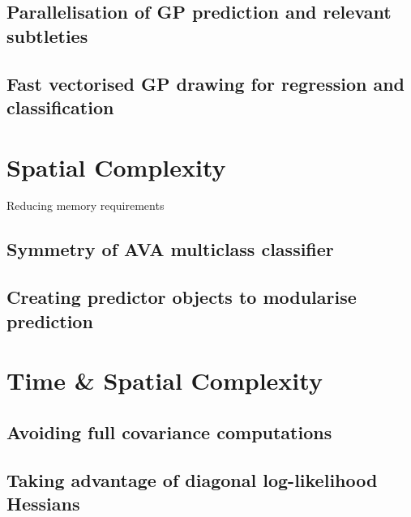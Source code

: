 		\subsection{Parallelisation of GP prediction and relevant subtleties}
		
		\subsection{Fast vectorised GP drawing for regression and classification}
		
	\section{Spatial Complexity}
	
		 Reducing memory requirements
		 
		\subsection{Symmetry of AVA multiclass classifier}
		
		\subsection{Creating predictor objects to modularise prediction}
		
	\section{Time \& Spatial Complexity}
	\label{Appendix:ComputationalAspects:TimeSpaceComplexity}
	
		\subsection{Avoiding full covariance computations}
		\label{Appendix:ComputationalAspects:TimeSpaceComplexity:CovarianceAvoidance}
		
		\subsection{Taking advantage of diagonal log-likelihood Hessians}
		\label{Appendix:ComputationalAspects:TimeSpaceComplexity:DiagonalHessians}
		
		